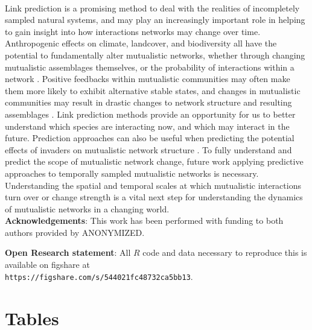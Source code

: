 \paragraph*{}
Link prediction is a promising method to deal with the realities of incompletely sampled natural systems, and may play an increasingly important role in helping to gain insight into how interactions networks may change over time. Anthropogenic effects on climate, landcover, and biodiversity all have the potential to fundamentally alter mutualistic networks, whether through changing mutualistic assemblages themselves, or the probability of interactions within a network \cite{tylianakis2017ecological, memmott2007global, teixido2022anthropogenic}. Positive feedbacks within mutualistic communities may often make them more likely to exhibit alternative stable states, and changes in mutualistic communities may result in drastic changes to network structure and resulting assemblages \cite{lever2014sudden, bascompte2022resilience}. Link prediction methods provide an opportunity for us to better understand which species are interacting now, and which may interact in the future. Prediction approaches can also be useful when predicting the potential effects of invaders on mutualistic network structure \cite{fricke2020accelerating,traveset2014mutualistic}. To fully understand and predict the scope of mutualistic network change, future work applying predictive approaches to temporally sampled mutualistic networks is necessary. Understanding the spatial and temporal scales at which mutualistic interactions turn over or change strength is a vital next step for understanding the dynamics of mutualistic networks in a changing world.\\

\noindent \textbf{Acknowledgements}: This work has been performed with funding to both authors provided by ANONYMIZED. 

\noindent \textbf{Open Research statement}: All $R$ code and data necessary to reproduce this is available on figshare at \\ \texttt{https://figshare.com/s/544021fc48732ca5bb13}.

\clearpage 

\section*{Tables} 


